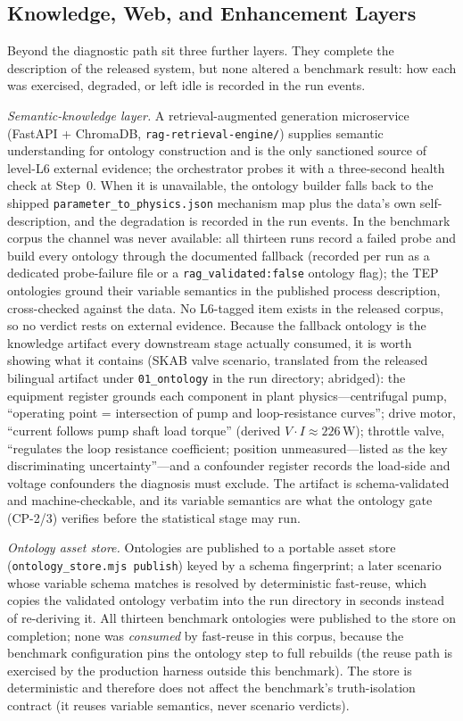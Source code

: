 \documentclass[preprint,10pt]{elsarticle}
\begin{document}
\subsection{Knowledge, Web, and Enhancement Layers}\label{sec:arch-layers}
Beyond the diagnostic path sit three further layers. They complete the description of the released system, but none altered a benchmark result: how each was exercised, degraded, or left idle is recorded in the run events.

\emph{Semantic-knowledge layer.} A retrieval-augmented generation microservice~\cite{lewis2020rag} (FastAPI + ChromaDB, \texttt{rag-retrieval-engine/}) supplies semantic understanding for ontology construction and is the only sanctioned source of level-L6 external evidence; the orchestrator probes it with a three-second health check at Step~0. When it is unavailable, the ontology builder falls back to the shipped \texttt{parameter\_to\_physics.json} mechanism map plus the data's own self-description, and the degradation is recorded in the run events. In the benchmark corpus the channel was never available: all thirteen runs record a failed probe and build every ontology through the documented fallback (recorded per run as a dedicated probe-failure file or a \texttt{rag\_validated:false} ontology flag); the TEP ontologies ground their variable semantics in the published process description, cross-checked against the data. No L6-tagged item exists in the released corpus, so no verdict rests on external evidence. Because the fallback ontology is the knowledge artifact every downstream stage actually consumed, it is worth showing what it contains (SKAB valve scenario, translated from the released bilingual artifact under \texttt{01\_ontology} in the run directory; abridged): the equipment register grounds each component in plant physics---centrifugal pump, ``operating point = intersection of pump and loop-resistance curves''; drive motor, ``current follows pump shaft load torque'' (derived $V\!\cdot\!I\approx226$\,W); throttle valve, ``regulates the loop resistance coefficient; position unmeasured---listed as the key discriminating uncertainty''---and a confounder register records the load-side and voltage confounders the diagnosis must exclude. The artifact is schema-validated and machine-checkable, and its variable semantics are what the ontology gate (CP-2/3) verifies before the statistical stage may run.

\emph{Ontology asset store.} Ontologies are published to a portable asset store (\texttt{ontology\_store.mjs publish}) keyed by a schema fingerprint; a later scenario whose variable schema matches is resolved by deterministic fast-reuse, which copies the validated ontology verbatim into the run directory in seconds instead of re-deriving it. All thirteen benchmark ontologies were published to the store on completion; none was \emph{consumed} by fast-reuse in this corpus, because the benchmark configuration pins the ontology step to full rebuilds (the reuse path is exercised by the production harness outside this benchmark). The store is deterministic and therefore does not affect the benchmark's truth-isolation contract (it reuses variable semantics, never scenario verdicts).
\end{document}
